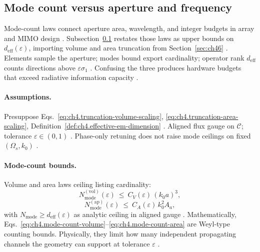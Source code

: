 ﻿\subsection{Mode count versus aperture and frequency}
\label{sec:ch481}

Mode-count laws connect aperture area, wavelength, and integer budgets in array and MIMO design \cite{collin2001,jackson1999,hansen1988}.
Subsection~\ref{sec:ch481} restates those laws as upper bounds on \(d_{\mathrm{eff}}(\varepsilon)\), importing volume and area truncation from
Section~\ref{sec:ch46} \cite{stratton1941,harrington2001,devaney2004}. Elements sample the aperture; modes bound export cardinality; operator rank
\(d_{\mathrm{eff}}\) counts directions above \(\varepsilon\sigma_{1}\) \cite{collin2001,hansen1988,harrington2001}. Confusing the three produces
hardware budgets that exceed radiative information capacity \cite{devaney2004,stratton1941}.

\paragraph{Assumptions.}
Presuppose Eqs.~\eqref{eq:ch4.truncation-volume-scaling}, \eqref{eq:ch4.truncation-area-scaling}, Definition~\ref{def:ch4.effective-em-dimension}
\cite{stratton1941,hansen1988,harrington2001}. Aligned flux gauge on \(\mathcal{C}\); tolerance \(\varepsilon\in(0,1)\) \cite{devaney2004,jackson1999}.
Phase-only retuning does not raise mode ceilings on fixed \((\Omega_{s},k_{0})\) \cite{devaney2004,harrington2001,stratton1941}.

\paragraph{Mode-count bounds.}
Volume and area laws ceiling listing cardinality:
\begin{equation}
\label{eq:ch4.mode-count-volume}
N_{\mathrm{mode}}^{\mathrm{(vol)}}(\varepsilon)\ \le\ C_{V}(\varepsilon)\,(k_{0}a)^{3},
\end{equation}
\begin{equation}
\label{eq:ch4.mode-count-area}
N_{\mathrm{mode}}^{\mathrm{(ap)}}(\varepsilon)\ \le\ C_{A}(\varepsilon)\,k_{0}^{2}A_{a},
\end{equation}
with \(N_{\mathrm{mode}}\ge d_{\mathrm{eff}}(\varepsilon)\) as analytic ceiling in aligned gauge \cite{collin2001,jackson1999,hansen1988,harrington2001}.
Mathematically, Eqs.~\eqref{eq:ch4.mode-count-volume}--\eqref{eq:ch4.mode-count-area} are Weyl-type counting bounds. Physically, they limit how many
independent propagating channels the geometry can support at tolerance \(\varepsilon\) \cite{stratton1941,devaney2004}.

